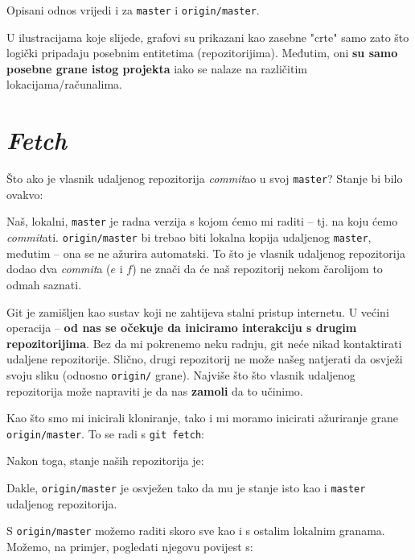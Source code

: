 Opisani odnos vrijedi i za \verb+master+ i \verb+origin/master+.

U ilustracijama koje slijede, grafovi su prikazani kao zasebne "crte" samo zato što logički pripadaju posebnim entitetima (repozitorijima).
Međutim, oni \textbf{su samo posebne grane istog projekta} iako se nalaze na različitim lokacijama/računalima.

\section*{\emph{Fetch}}

Što ako je vlasnik udaljenog repozitorija \emph{commit}ao u svoj \verb+master+?
Stanje bi bilo ovakvo:



Naš, lokalni, \verb+master+ je radna verzija s kojom ćemo mi raditi -- tj. na koju ćemo \emph{commit}ati.
\verb+origin/master+ bi trebao biti lokalna kopija udaljenog \verb+master+, međutim -- ona se ne ažurira automatski.
To što je vlasnik udaljenog repozitorija dodao dva \emph{commit}a ($e$ i $f$) ne znači da će naš repozitorij nekom čarolijom to odmah saznati.

Git je zamišljen kao sustav koji ne zahtijeva stalni pristup internetu.
U većini operacija -- \textbf{od nas se očekuje da iniciramo interakciju s drugim repozitorijima}.
Bez da mi pokrenemo neku radnju, git neće nikad kontaktirati udaljene repozitorije.
Slično, drugi repozitorij ne može našeg natjerati da osvježi svoju sliku (odnosno \verb+origin/+ grane).
Najviše što što vlasnik udaljenog repozitorija može napraviti je da nas \textbf{zamoli} da to učinimo.

Kao što smo mi inicirali kloniranje, tako i mi moramo inicirati ažuriranje grane \verb+origin/master+.
To se radi s \verb+git fetch+:



Nakon toga, stanje naših repozitorija je:



Dakle, \verb+origin/master+ je osvježen tako da mu je stanje isto kao i \verb+master+ udaljenog repozitorija.

S \verb+origin/master+ možemo raditi skoro sve kao i s ostalim lokalnim granama.
Možemo, na primjer, pogledati njegovu povijest s:



